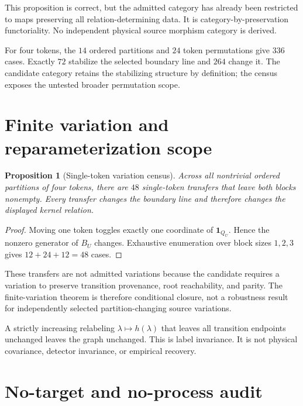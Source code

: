 \documentclass[11pt]{article}
\newtheorem{proposition}{Proposition}
\begin{document}
This proposition is correct, but the admitted category has already been
restricted to maps preserving all relation-determining data. It is
category-by-preservation functoriality. No independent physical source
morphism category is derived.

For four tokens, the \(14\) ordered partitions and \(24\) token permutations
give \(336\) cases. Exactly \(72\) stabilize the selected boundary line and
\(264\) change it. The candidate category retains the stabilizing structure
by definition; the census exposes the untested broader permutation scope.

\section{Finite variation and reparameterization scope}

\begin{proposition}[Single-token variation census]
Across all nontrivial ordered partitions of four tokens, there are \(48\)
single-token transfers that leave both blocks nonempty. Every transfer changes
the boundary line and therefore changes the displayed kernel relation.
\end{proposition}

\begin{proof}
Moving one token toggles exactly one coordinate of
\(\mathbf 1_{Q_U}\). Hence the nonzero generator of \(B_U\) changes. Exhaustive
enumeration over block sizes \(1,2,3\) gives \(12+24+12=48\) cases.
\end{proof}

These transfers are not admitted variations because the candidate requires a
variation to preserve transition provenance, root reachability, and parity.
The finite-variation theorem is therefore conditional closure, not a
robustness result for independently selected partition-changing source
variations.

A strictly increasing relabeling \(\lambda\mapsto h(\lambda)\) that leaves
all transition endpoints unchanged leaves the graph unchanged. This is label
invariance. It is not physical covariance, detector invariance, or empirical
recovery.

\section{No-target and no-process audit}
\end{document}
